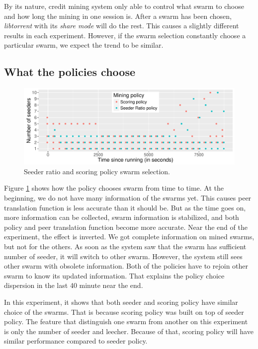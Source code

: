 By its nature, credit mining system only able to control what swarm to choose and how long the mining in one session is. After a swarm has been chosen, \textit{libtorrent} with its \textit{share mode} will do the rest. This causes a slightly different results in each experiment. However, if the swarm selection constantly choose a particular swarm, we expect the trend to be similar. 

\subsection{What the policies choose}
\begin{figure}[h]
	\centering
	\includegraphics[width=\textwidth]{pics/results/scsr_notrig_scatter.pdf}
	\caption{Seeder ratio and scoring policy swarm selection.}
	\label{fig:scatterscsrnotrig}
\end{figure}

Figure \ref{fig:scatterscsrnotrig} shows how the policy chooses swarm from time to time. At the beginning, we do not have many information of the swarms yet. This causes peer translation function is less accurate than it should be. But as the time goes on, more information can be collected, swarm information is stabilized, and both policy and peer translation function become more accurate. Near the end of the experiment, the effect is inverted. We got complete information on mined swarms, but not for the others. As soon as the system saw that the swarm has sufficient number of seeder, it will switch to other swarm. However, the system still sees other swarm with obsolete information. Both of the policies have to rejoin other swarm to know its updated information. That explains the policy choice dispersion in the last 40 minute near the end.

In this experiment, it shows that both seeder and scoring policy have similar choice of the swarms. That is because scoring policy was built on top of seeder policy. The feature that distinguish one swarm from another on this experiment is only the number of seeder and leecher. Because of that, scoring policy will have similar performance compared to seeder policy. 

